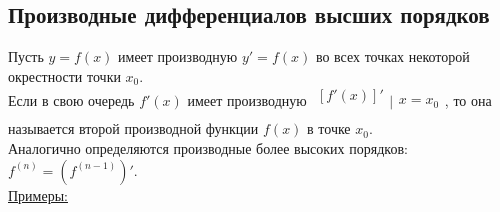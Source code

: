 \documentclass[12pt]{article}
\begin{document}
    \subsection{Производные дифференциалов высших порядков}
    \noindent Пусть $y = f(x)$ имеет производную $y' = f(x)$ во всех точках некоторой окрестности точки $x_0$.\\
    Если в свою очередь $f'(x)$ имеет производную $\begin{matrix}[f'(x)]'\\\\\end{matrix}\Big|\begin{matrix}\\x=x_0\\\end{matrix}$, то она называется второй производной функции $f(x)$ в точке $x_0$.\\
    Аналогично определяются производные более высоких порядков: $f^{(n)} = (f^{(n-1)})'$.\\
    \underline{Примеры:}
\end{document}
